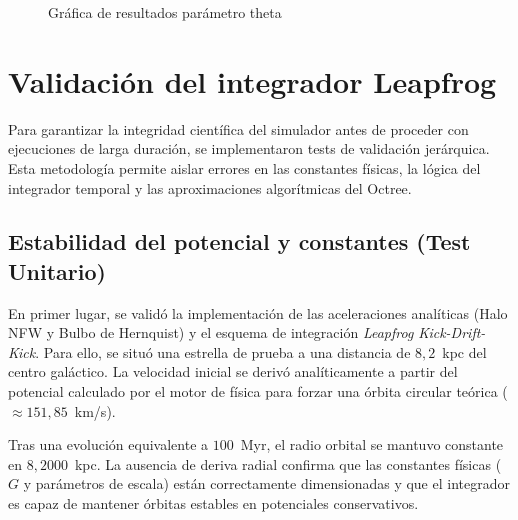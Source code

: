 \begin{figure}[h!]
    \caption{Gráfica de resultados parámetro theta}
    \label{fig:theta}
\end{figure}

\section{Validación del integrador Leapfrog}\label{sec:precision-fisica-y-validacion-del-integrador-leapfrog}

Para garantizar la integridad científica del simulador antes de proceder con ejecuciones de larga duración, se implementaron tests de validación jerárquica.
Esta metodología permite aislar errores en las constantes físicas, la lógica del integrador temporal y las aproximaciones algorítmicas del Octree.

\subsection{Estabilidad del potencial y constantes (Test Unitario)}

En primer lugar, se validó la implementación de las aceleraciones analíticas (Halo NFW y Bulbo de Hernquist) y el esquema de integración \textit{Leapfrog Kick-Drift-Kick}.
Para ello, se situó una estrella de prueba a una distancia de $8,2$~kpc del centro galáctico.
La velocidad inicial se derivó analíticamente a partir del potencial calculado por el motor de física para forzar una órbita circular teórica ($\approx 151,85$~km/s).

Tras una evolución equivalente a $100$~Myr, el radio orbital se mantuvo constante en $8,2000$~kpc.
La ausencia de deriva radial confirma que las constantes físicas ($G$ y parámetros de escala) están correctamente dimensionadas y que el integrador es capaz de mantener órbitas estables en potenciales conservativos.

